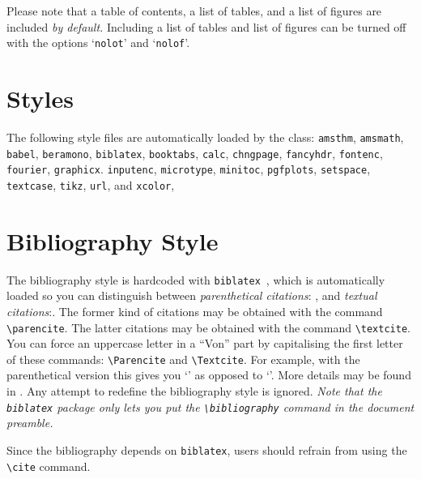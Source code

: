 \documentclass[MScDSA]{uccthesis}
\newcommand*{\COMMAND}[1]{\texttt{\textbackslash #1}}
\begin{document}
      Please note that a table of contents,
       a list of tables, and
       a list of figures are included \emph{by default.}
      Including a list of tables and list of figures
       can be turned off with the options
       `\texttt{nolot}' and `\texttt{nolof}'.

   \section{Styles}

      The following style files are automatically loaded by
       the class:
       \texttt{amsthm},
       \texttt{amsmath},
       \texttt{babel},
       \texttt{beramono},
       \texttt{biblatex},
       \texttt{booktabs},
       \texttt{calc},
       \texttt{chngpage},
       \texttt{fancyhdr},
       \texttt{fontenc},
       \texttt{fourier},
       \texttt{graphicx}.
       \texttt{inputenc},
       \texttt{microtype},
       \texttt{minitoc},
       \texttt{pgfplots},
       \texttt{setspace},
       \texttt{textcase},
       \texttt{tikz},
       \texttt{url}, and
       \texttt{xcolor},

   \section{Bibliography Style}

      The bibliography style is hardcoded
       with \texttt{biblatex}~\parencite{biblatex}, which
       is automatically loaded so you can
       distinguish between
       \emph{parenthetical citations}: \parencite{biblatex}, and
       \emph{textual citations}:\textcite{biblatex}.
      The former kind of citations may be obtained
       with the command \COMMAND{parencite}.
      The latter citations may be obtained
       with the command \COMMAND{textcite}.
      You can force an uppercase letter in a ``Von'' part by
       capitalising the first letter of these commands:
       \COMMAND{Parencite} and
       \COMMAND{Textcite}.
      For example,
       with the parenthetical version this gives you
       `\Textcite{LAF}' as opposed to `\textcite{LAF}'.
      More details may be found in \Textcite{LAF}.
      Any attempt to redefine the bibliography style is ignored.
      \emph{Note that the \texttt{biblatex} package
             only lets you put the \COMMAND{bibliography}
             command in the document preamble.}

      Since the bibliography depends on \texttt{biblatex},
       users should refrain from using the \COMMAND{cite} command.
\end{document}
